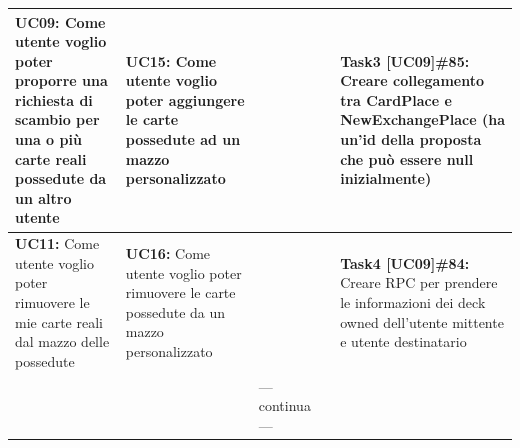 \documentclass[a4paper, oneside]{article}
\begin{document}
\begin{landscape}
\begin{tabular}{ | p{5cm} | p{5cm} | p{3cm} | p{3cm} | p{7cm}| }
            \hline
            \textbf{UC09:} Come utente voglio poter proporre una richiesta di scambio per una o più carte reali possedute da un altro utente &  \textbf{UC15:} Come utente voglio poter aggiungere le carte possedute ad un mazzo personalizzato   & & & \textbf{Task3 [UC09]\#85:} Creare collegamento tra CardPlace e NewExchangePlace (ha un'id della proposta che può essere null inizialmente)  \\
            \hline
            \textbf{UC11:} Come utente voglio poter rimuovere le mie carte reali dal mazzo delle possedute & \textbf{UC16:} Come utente voglio poter rimuovere le carte possedute da un mazzo personalizzato &  & &  \textbf{Task4 [UC09]\#84:} Creare RPC per prendere le informazioni dei deck owned dell'utente mittente e utente destinatario \\
            \hline
            & & --- continua --- & & \\
            \hline
        \end{tabular}


\end{landscape}
\end{document}
